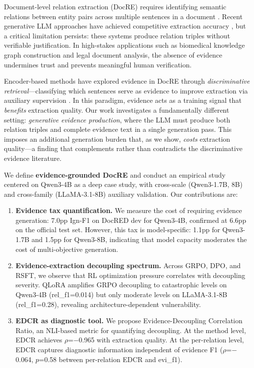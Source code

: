 \documentclass[11pt,a4paper]{article}
\newcommand{\edcr}{EDCR}
\begin{document}
Document-level relation extraction (DocRE) requires identifying semantic relations between entity pairs across multiple sentences in a document \cite{yao2019docred}.
Recent generative LLM approaches have achieved competitive extraction accuracy \cite{wadhwa2023revisiting}, but a critical limitation persists: these systems produce relation triples without verifiable justification.
In high-stakes applications such as biomedical knowledge graph construction and legal document analysis, the absence of evidence undermines trust and prevents meaningful human verification.

Encoder-based methods have explored evidence in DocRE through \emph{discriminative retrieval}---classifying which sentences serve as evidence to improve extraction via auxiliary supervision \cite{xu2022sais, ma2023dreeam}.
In this paradigm, evidence acts as a training signal that \emph{benefits} extraction quality.
Our work investigates a fundamentally different setting: \emph{generative evidence production}, where the LLM must produce both relation triples and complete evidence text in a single generation pass.
This imposes an additional generation burden that, as we show, \emph{costs} extraction quality---a finding that complements rather than contradicts the discriminative evidence literature.

We define \textbf{evidence-grounded DocRE} and conduct an empirical study centered on Qwen3-4B as a deep case study, with cross-scale (Qwen3-1.7B, 8B) and cross-family (LLaMA-3.1-8B) auxiliary validation.
Our contributions are:

\begin{enumerate}
    \item \textbf{Evidence tax quantification.} We measure the cost of requiring evidence generation: 7.0pp Ign-F1 on DocRED dev for Qwen3-4B, confirmed at 6.6pp on the official test set. However, this tax is model-specific: 1.1pp for Qwen3-1.7B and 1.5pp for Qwen3-8B, indicating that model capacity moderates the cost of multi-objective generation.

    \item \textbf{Evidence-extraction decoupling spectrum.} Across GRPO, DPO, and RSFT, we observe that RL optimization pressure correlates with decoupling severity. QLoRA amplifies GRPO decoupling to catastrophic levels on Qwen3-4B (rel\_f1=0.014) but only moderate levels on LLaMA-3.1-8B (rel\_f1=0.28), revealing architecture-dependent vulnerability.

    \item \textbf{\edcr{} as diagnostic tool.} We propose Evidence-Decoupling Correlation Ratio, an NLI-based metric for quantifying decoupling. At the method level, \edcr{} achieves $\rho$=$-$0.965 with extraction quality. At the per-relation level, \edcr{} captures diagnostic information independent of evidence F1 ($\rho$=$-$0.064, $p$=0.58 between per-relation \edcr{} and evi\_f1).
\end{enumerate}
\end{document}
